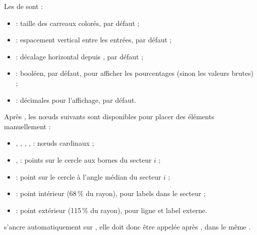\documentclass[11pt,a4paper]{ltxdoc}
\begin{document}
\smallskip

Les \MontreCode{[clés]} de  sont :

\begin{itemize}
  \item {} : taille des carreaux colorés,  par défaut ;
  \item {} : espacement vertical entre les entrées,  par défaut ;
  \item {} : décalage horizontal depuis ,  par défaut ;
  \item {} : booléen,  par défaut, pour afficher les pourcentages (sinon les valeurs brutes) ;
  \item {} : décimales pour l'affichage,  par défaut.
\end{itemize}

\smallskip

Après , les nœuds suivants sont disponibles pour placer des éléments manuellement :

\begin{itemize}
  \item {}, , , ,  : nœuds cardinaux ;
  \item {},  : points sur le cercle aux bornes du secteur $i$ ;
  \item {} : point sur le cercle à l'angle médian du secteur $i$ ;
  \item {} : point intérieur (68\,\% du rayon), pour labels dans le secteur ;
  \item {} : point extérieur (115\,\% du rayon), pour ligne et label externe.
\end{itemize}

\smallskip

 s'ancre automatiquement sur , elle doit donc être appelée après , dans le même .
\end{document}
